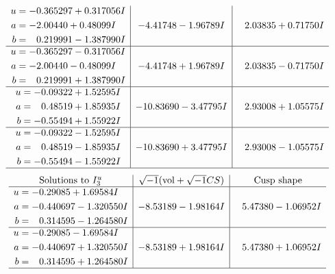 \documentclass[1p]{elsarticle_modified}
\theoremstyle{definition}
\newcommand{\I}{\sqrt{-1}}
\begin{document}
$$\begin{array}{c|c|c}
\begin{aligned}
u &= -0.365297 + 0.317056 I \\
a &= -2.00440 + 0.48099 I \\
b &= \phantom{-}0.219991 - 1.387990 I\end{aligned}
 & -4.41748 - 1.96789 I & \phantom{-}2.03835 + 0.71750 I \\ \hline\begin{aligned}
u &= -0.365297 - 0.317056 I \\
a &= -2.00440 - 0.48099 I \\
b &= \phantom{-}0.219991 + 1.387990 I\end{aligned}
 & -4.41748 + 1.96789 I & \phantom{-}2.03835 - 0.71750 I \\ \hline\begin{aligned}
u &= -0.09322 + 1.52595 I \\
a &= \phantom{-}0.48519 + 1.85935 I \\
b &= -0.55494 + 1.55922 I\end{aligned}
 & -10.83690 - 3.47795 I & \phantom{-}2.93008 + 1.05575 I \\ \hline\begin{aligned}
u &= -0.09322 - 1.52595 I \\
a &= \phantom{-}0.48519 - 1.85935 I \\
b &= -0.55494 - 1.55922 I\end{aligned}
 & -10.83690 + 3.47795 I & \phantom{-}2.93008 - 1.05575 I\\
 \hline 
 \end{array}$$\newpage$$\begin{array}{c|c|c}  
\text{Solutions to }I^u_{3}& \I (\text{vol} + \sqrt{-1}CS) & \text{Cusp shape}\\
 \hline 
\begin{aligned}
u &= -0.29085 + 1.69584 I \\
a &= -0.440697 - 1.320550 I \\
b &= \phantom{-}0.314595 - 1.264580 I\end{aligned}
 & -8.53189 - 1.98164 I & \phantom{-}5.47380 - 1.06952 I \\ \hline\begin{aligned}
u &= -0.29085 - 1.69584 I \\
a &= -0.440697 + 1.320550 I \\
b &= \phantom{-}0.314595 + 1.264580 I\end{aligned}
 & -8.53189 + 1.98164 I & \phantom{-}5.47380 + 1.06952 I\\
 \hline 
 \end{array}$$\newpage
\end{document}
